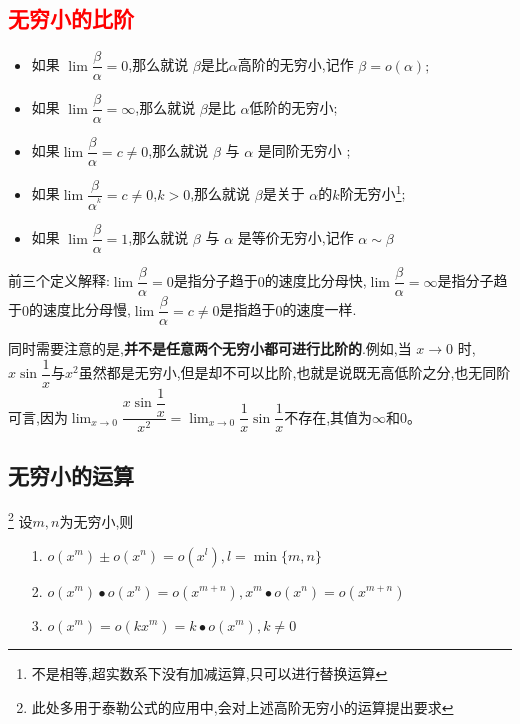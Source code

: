 \documentclass[12pt, a4paper, oneside, UTF8]{ctexbook}
\begin{document}
\begin{sloppypar}
    \subsection{\textcolor{red}{无穷小的比阶}}
    \begin{defn}{}{}
        \begin{itemize}
            \item 如果 $\lim \dfrac{\beta}{\alpha} =0$,那么就说 $\beta$是比$\alpha$高阶的无穷小,记作 $\beta=o(\alpha);$
            \item  如果 $\lim \dfrac\beta\alpha  =\infty$,那么就说 $\beta$是比 $\alpha$低阶的无穷小;
            \item 如果$\lim\dfrac{\beta}{\alpha} =c\neq 0$,那么就说 $\beta$ 与 $\alpha$ 是同阶无穷小 ;
            \item 如果$\lim\dfrac{\beta}{\alpha^{^k}} =c \neq 0$,$k > 0$,那么就说 $\beta$是关于 $\alpha$的$k$阶无穷小\footnote{不是相等,超实数系下没有加减运算,只可以进行替换运算};
            \item 如果 $\lim \dfrac\beta\alpha = 1$,那么就说 $\beta$ 与 $\alpha$ 是等价无穷小,记作 $\alpha\sim\beta$
        \end{itemize}
    \end{defn}
    前三个定义解释:$\lim \dfrac{\beta}{\alpha} =0$是指分子趋于$0$的速度比分母快,$\lim \dfrac\beta\alpha  =\infty$是指分子趋于$0$的速度比分母慢,$\lim\dfrac{\beta}{\alpha} =c\neq 0$是指趋于$0$的速度一样.

    同时需要注意的是,\textbf{并不是任意两个无穷小都可进行比阶的}.例如,当 $x\to 0$ 时,$x\sin\dfrac1x$与$x^2$虽然都是无穷小,但是却不可以比阶,也就是说既无高低阶之分,也无同阶可言,因为$\lim_{x \to 0}\dfrac{x \sin \dfrac{1}{x}}{x^2}=\lim_{x\to0}\dfrac1x\sin\dfrac1x$不存在,其值为$\infty$和$0$。
    \subsection{无穷小的运算}\footnote{此处多用于泰勒公式的应用中,会对上述高阶无穷小的运算提出要求}
    设$m,n$为无穷小,则
    \begin{itemize}
        \item[1.] $o(x^{m})\pm o(x^{n})=o(x^{l}),l=\min\{m,n\}$
        \item[2.] $o(x^{m})\bullet o(x^{n})=o(x^{m+n}),x^{m}\bullet o(x^{n})=o(x^{m+n})$
        \item[3.] $o(x^{m})=o(kx^{m})=k\bullet o(x^{m}),k \neq 0$
    \end{itemize}

\end{sloppypar}
\end{document}
